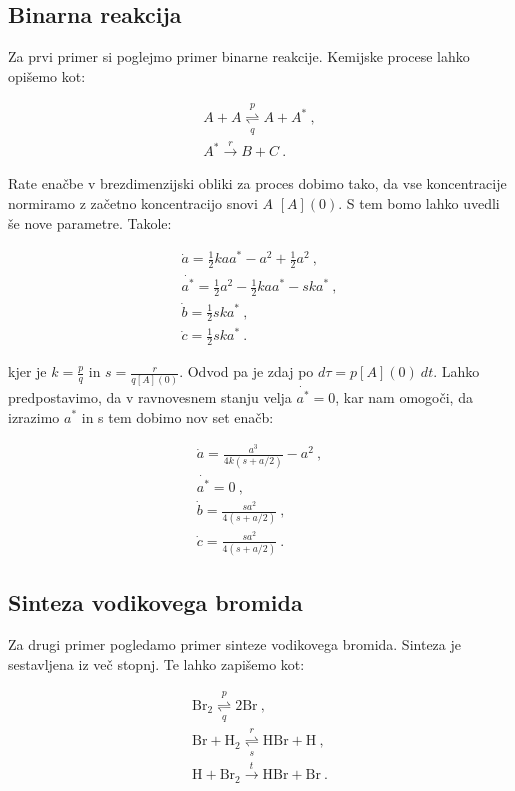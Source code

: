 \documentclass[a4paper]{article}
\begin{document}
\subsection{Binarna reakcija}
Za prvi primer si poglejmo primer binarne reakcije. Kemijske procese lahko opišemo kot:

\begin{gather}
    A + A \overset{p}{\underset{q}{\rightleftharpoons}} A + A^*\>,\\
    A^* \overset{r}{\rightarrow} B + C\>.
\end{gather}

Rate enačbe v brezdimenzijski obliki za proces dobimo tako, da vse koncentracije normiramo
z začetno koncentracijo snovi $A$ $[A](0)$. S tem bomo lahko uvedli še nove parametre. Takole:

\begin{gather}
    \dot{a} = \frac{1}{2} kaa^* - a^2 + \frac{1}{2}a^2\>,\\
    \dot{a^*} = \frac{1}{2}a^2 - \frac{1}{2} kaa^* - ska^*\>,\\
    \dot{b} = \frac{1}{2} ska^*\>,\\
    \dot{c} = \frac{1}{2} ska^*\>.
\end{gather}

kjer je $k = \frac{p}{q}$ in $s = \frac{r}{q[A](0)}$. Odvod pa je zdaj po $d\tau = p[A](0)\>dt$. Lahko
predpostavimo, da v ravnovesnem stanju velja $\dot{a^*} = 0$, kar nam omogoči, da izrazimo $a^*$ in s tem 
dobimo nov set enačb:

\begin{gather}
    \dot{a} = \frac{a^3}{4k(s + a/2)} - a^2\>,\\
    \dot{a^*} = 0\>,\\
    \dot{b} = \frac{sa^2}{4(s + a/2)}\>,\\
    \dot{c} = \frac{sa^2}{4(s + a/2)}\>.
\end{gather}

\subsection{Sinteza vodikovega bromida}
Za drugi primer pogledamo primer sinteze vodikovega bromida. Sinteza je sestavljena iz več stopnj. Te lahko
zapišemo kot:

\begin{gather}
    \mathrm{Br}_2 \overset{p}{\underset{q}{\rightleftharpoons}} 2\mathrm{Br}\>,\\
    \mathrm{Br} + \mathrm{H}_2 \overset{r}{\underset{s}{\rightleftharpoons}} \mathrm{HBr} + \mathrm{H}\>,\\
    \mathrm{H} + \mathrm{Br}_2 \overset{t}{\rightarrow} \mathrm{HBr} + \mathrm{Br}\>.
\end{gather}
\end{document}
